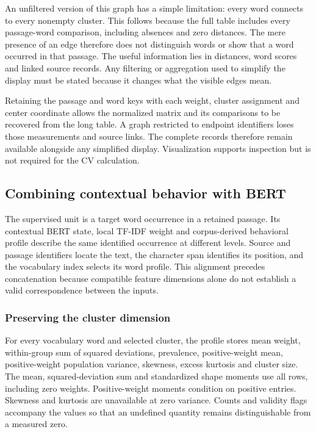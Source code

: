 \documentclass[10pt,letterpaper]{article}
\begin{document}
An unfiltered version of this graph has a simple limitation: every word connects to every nonempty cluster. This follows because the full table includes every passage-word comparison, including absences and zero distances. The mere presence of an edge therefore does not distinguish words or show that a word occurred in that passage. The useful information lies in distances, word scores and linked source records. Any filtering or aggregation used to simplify the display must be stated because it changes what the visible edges mean.\par

Retaining the passage and word keys with each weight, cluster assignment and center coordinate allows the normalized matrix and its comparisons to be recovered from the long table. A graph restricted to endpoint identifiers loses those measurements and source links. The complete records therefore remain available alongside any simplified display. Visualization supports inspection but is not required for the CV calculation.\par

\subsection{Combining contextual behavior with BERT}
The supervised unit is a target word occurrence in a retained passage. Its contextual BERT state, local TF-IDF weight and corpus-derived behavioral profile describe the same identified occurrence at different levels. Source and passage identifiers locate the text, the character span identifies its position, and the vocabulary index selects its word profile. This alignment precedes concatenation because compatible feature dimensions alone do not establish a valid correspondence between the inputs.\par

\subsubsection{Preserving the cluster dimension}
For every vocabulary word and selected cluster, the profile stores mean weight, within-group sum of squared deviations, prevalence, positive-weight mean, positive-weight population variance, skewness, excess kurtosis and cluster size. The mean, squared-deviation sum and standardized shape moments use all rows, including zero weights. Positive-weight moments condition on positive entries. Skewness and kurtosis are unavailable at zero variance. Counts and validity flags accompany the values so that an undefined quantity remains distinguishable from a measured zero.\par
\end{document}
